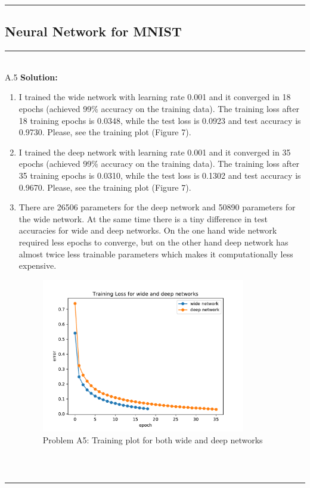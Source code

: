 \documentclass{article}
\newcommand{\1}{\mathbf{1}}
\begin{document}
\noindent\rule{\textwidth}{1pt}

\subsection*{Neural Network for MNIST}
\noindent\rule{\textwidth}{1pt}
\\
A.5 {\bf Solution:}\\
\begin{enumerate}
    \item I trained the wide network with learning rate 0.001 and it converged in 18 epochs (achieved 99\% accuracy on the training data). The training loss after 18 training epochs is 0.0348, while the test loss is 0.0923 and test accuracy is 0.9730. Please, see the training plot (Figure 7). 
    
    \item I trained the deep network with learning rate 0.001 and it converged in 35 epochs (achieved 99\% accuracy on the training data). The training loss after 35 training epochs is 0.0310, while the test loss is 0.1302 and test accuracy is 0.9670. Please, see the training plot (Figure 7). 
    
    \item There are 26506 parameters for the deep network and 50890 parameters for the wide network. At the same time there is a tiny difference in test accuracies for wide and deep networks. On the one hand wide network required less epochs to converge, but on the other hand deep network has almost twice less trainable parameters which makes it computationally less expensive. 
    
\begin{figure}[h!]
    \centering
    \includegraphics[width=0.84\textwidth]{hw3/code/figures/A5.pdf}
    \caption{Problem A5: Training plot for both wide and deep networks}
\end{figure}
\end{enumerate}   
\inputminted{python}{code/A5.py}
\caption{Code for A5}\\
\noindent\rule{\textwidth}{1pt}
\end{document}
